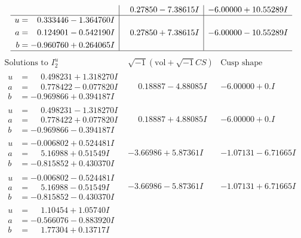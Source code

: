 \documentclass[1p]{elsarticle_modified}
\theoremstyle{definition}
\newcommand{\I}{\sqrt{-1}}
\begin{document}
$$\begin{array}{c|c|c}
 & \phantom{-}0.27850 - 7.38615 I & -6.00000 + 10.55289 I \\ \hline\begin{aligned}
u &= \phantom{-}0.333446 - 1.364760 I \\
a &= \phantom{-}0.124901 - 0.542190 I \\
b &= -0.960760 + 0.264065 I\end{aligned}
 & \phantom{-}0.27850 + 7.38615 I & -6.00000 - 10.55289 I\\
 \hline 
 \end{array}$$\newpage$$\begin{array}{c|c|c}  
\text{Solutions to }I^u_{2}& \I (\text{vol} + \sqrt{-1}CS) & \text{Cusp shape}\\
 \hline 
\begin{aligned}
u &= \phantom{-}0.498231 + 1.318270 I \\
a &= \phantom{-}0.778422 - 0.077820 I \\
b &= -0.969866 + 0.394187 I\end{aligned}
 & \phantom{-}0.18887 - 4.88085 I & -6.00000 + 0. I\phantom{ +0.000000I} \\ \hline\begin{aligned}
u &= \phantom{-}0.498231 - 1.318270 I \\
a &= \phantom{-}0.778422 + 0.077820 I \\
b &= -0.969866 - 0.394187 I\end{aligned}
 & \phantom{-}0.18887 + 4.88085 I & -6.00000 + 0. I\phantom{ +0.000000I} \\ \hline\begin{aligned}
u &= -0.006802 + 0.524481 I \\
a &= \phantom{-}5.16988 + 0.51549 I \\
b &= -0.815852 + 0.430370 I\end{aligned}
 & -3.66986 + 5.87361 I & -1.07131 - 6.71665 I \\ \hline\begin{aligned}
u &= -0.006802 - 0.524481 I \\
a &= \phantom{-}5.16988 - 0.51549 I \\
b &= -0.815852 - 0.430370 I\end{aligned}
 & -3.66986 - 5.87361 I & -1.07131 + 6.71665 I \\ \hline\begin{aligned}
u &= \phantom{-}1.10454 + 1.05740 I \\
a &= -0.566076 - 0.883920 I \\
b &= \phantom{-}1.77304 + 0.13717 I\end{aligned}

\end{array}$$
\end{document}
